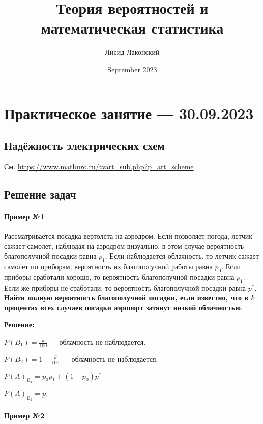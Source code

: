 \documentclass{article}
\title{Теория вероятностей и математическая статистика}
\author{Лисид Лаконский}
\date{September 2023}
\begin{document}
\raggedright

\maketitle

\tableofcontents
\pagebreak

\section{Практическое занятие — 30.09.2023}

\subsection{Надёжность электрических схем}

См. \url{https://www.matburo.ru/tvart_sub.php?p=art_scheme}

\subsection{Решение задач}

\paragraph{Пример №1}

Рассматривается посадка вертолета на аэродром. Если позволяет погода, летчик сажает самолет, наблюдая на аэродром визуально, в этом случае вероятность благополучной посадки равна $p_1$. Если наблюдается облачность, то летчик сажает самолет по приборам, вероятность их благополучной работы равна $p_0$. Если приборы сработали хорошо, то вероятность благополучной посадки равна $p_1$. Если же приборы не сработали, то вероятность благополучной посадки равна $p^{*}$. \textbf{Найти полную вероятность благополучной посадки, если известно, что в $k$ процентах всех случаев посадки аэропорт затянут низкой облачностью}.

\textbf{Решение:}

$P(B_1) = \frac{k}{100}$ — облачность не наблюдается.

$P(B_2) = 1 - \frac{k}{100}$ — облачность не наблюдается.

$P(A)_{B_1} = p_0 p_1 + (1 - p_0) p^{*}$

$P(A)_{B_2} = p_1$

\paragraph{Пример №2}
\end{document}
